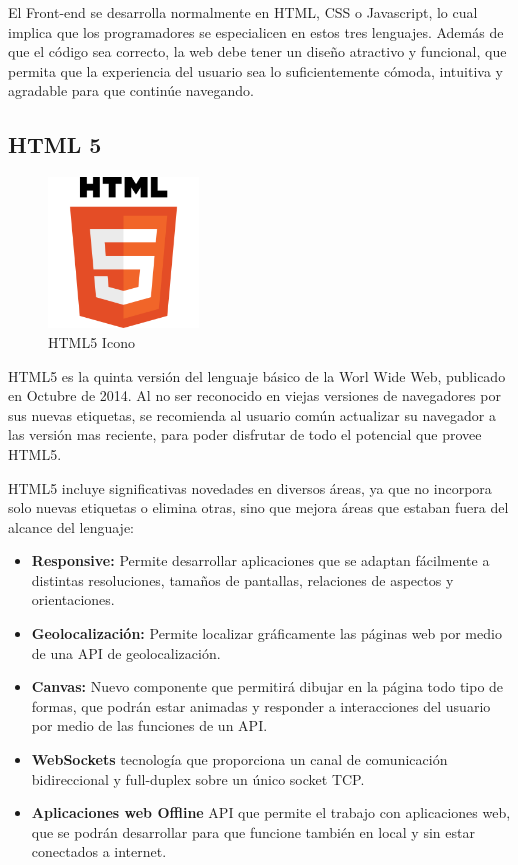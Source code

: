 El Front-end se desarrolla normalmente en HTML, CSS o Javascript, lo cual implica que los programadores se especialicen en estos tres lenguajes. Además de que el código sea correcto, la web debe tener un diseño atractivo y funcional, que permita que la experiencia del usuario sea lo suficientemente cómoda, intuitiva y agradable para que continúe navegando.

\subsection{HTML 5}
\begin{figure}[!h]
    \centering
    \includegraphics[width=40mm]{img/introduccion/html5.png}
    \caption{HTML5 Icono}
\end{figure}
HTML5 es la quinta versión del lenguaje básico de la Worl Wide Web, publicado en Octubre de 2014. Al no ser reconocido en viejas versiones de navegadores por sus nuevas etiquetas, se recomienda al usuario común actualizar su navegador a las versión mas reciente, para poder disfrutar de todo el potencial que provee HTML5.

HTML5 incluye significativas novedades en diversos áreas, ya que no incorpora solo nuevas etiquetas o elimina otras, sino que mejora áreas que estaban fuera del alcance del lenguaje:

\begin{itemize}
    \item \textbf{Responsive: } Permite desarrollar aplicaciones que se adaptan fácilmente a distintas resoluciones, tamaños de pantallas, relaciones de aspectos y orientaciones.
    \item \textbf{Geolocalización: }Permite localizar gráficamente las páginas web por medio de una API de geolocalización.
    \item \textbf{Canvas: } Nuevo componente que permitirá dibujar en la página todo tipo de formas, que podrán estar animadas y responder a interacciones del usuario por medio de las funciones de un API.
    \item \textbf{WebSockets } tecnología que proporciona un canal de comunicación bidireccional y full-duplex sobre un único socket TCP.
    \item \textbf{Aplicaciones web Offline } API que permite el trabajo con aplicaciones web, que se podrán desarrollar para que funcione también en local y sin estar conectados a internet.
\end{itemize}
